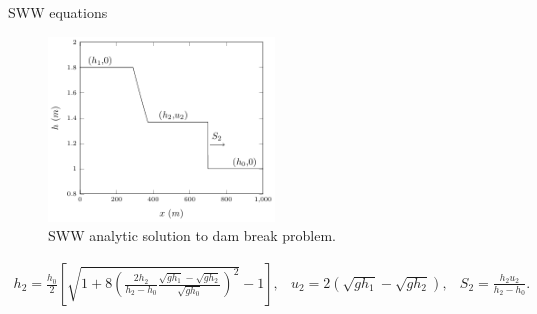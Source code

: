 \documentclass[pdf]{beamer}
\begin{document}
\begin{frame}{SWW equations}
	\begin{figure}
		\centering
		\includegraphics[width=6cm]{../Pics/Edit/SWWlabel.pdf}
		\caption{SWW analytic solution to dam break problem.}
		\label{fig:SWWval}
	\end{figure}
	
\end{frame}
\begin{frame}
	
	\begin{subequations}
		\begin{gather*}
		h_2 = \frac{h_0}{2} \left[\sqrt{1 + 8 \left(\frac{2h_2}{h_2 - h_0}\frac{\sqrt{gh_1} - \sqrt{gh_2}}{\sqrt{gh_0}}\right)^2} - 1\right],
		\label{eq:h2def}
		\end{gather*}
		\begin{gather*}
		u_2 = 2\left(\sqrt{gh_1} - \sqrt{gh_2}\right),
		\label{eq:u2def}
		\end{gather*}
		\begin{gather*}
		S_2 = \frac{h_2 u_2}{h_2 - h_0}.
		\label{eq:S2def}
		\end{gather*}
		
	\end{subequations}
	
\end{frame}
\end{document}
